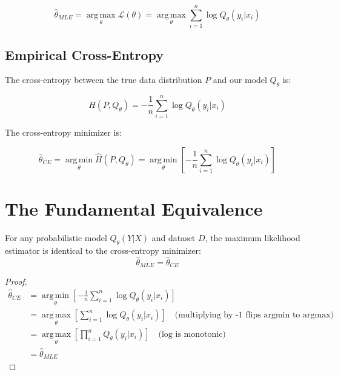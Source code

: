 \begin{notechapter}
\begin{definition}
\[
\hat{\theta}_{MLE} = 
\operatorname*{arg\,max}_{\theta} \mathcal{L}(\theta) = 
\operatorname*{arg\,max}_{\theta} \sum_{i=1}^n \log Q_\theta(y_i | x_i)
\]
\end{definition}

\subsection{Empirical Cross-Entropy}

The cross-entropy between the true data distribution $P$ and our model $Q_\theta$ is:

\begin{definition}
\[
\hat{H}(P, Q_\theta) = -\frac{1}{n} \sum_{i=1}^n \log Q_\theta(y_i | x_i)
\]
\end{definition}

The cross-entropy minimizer is:

\begin{definition}
\[
\hat{\theta}_{CE} = 
\operatorname*{arg\,min}_{\theta} \hat{H}(P, Q_\theta) = 
\operatorname*{arg\,min}_{\theta} \left[ -\frac{1}{n} \sum_{i=1}^n \log Q_\theta(y_i | x_i) \right]
\]
\end{definition}

\section{The Fundamental Equivalence}

\begin{theorem}
For any probabilistic model $Q_\theta(Y|X)$ and dataset $D$, the maximum likelihood estimator is identical to the cross-entropy minimizer:
\[
\hat{\theta}_{MLE} = \hat{\theta}_{CE}
\]
\end{theorem}

\begin{proof}
\begin{align*}
\hat{\theta}_{CE} &= \operatorname*{arg\,min}_{\theta} \left[ -\frac{1}{n} \sum_{i=1}^n \log Q_\theta(y_i | x_i) \right] \\
&= \operatorname*{arg\,max}_{\theta} \left[ \sum_{i=1}^n \log Q_\theta(y_i | x_i) \right] \quad \text{(multiplying by -1 flips argmin to argmax)} \\
&= \operatorname*{arg\,max}_{\theta} \left[ \prod_{i=1}^n Q_\theta(y_i | x_i) \right] \quad \text{(log is monotonic)} \\
&= \hat{\theta}_{MLE}
\end{align*}


\end{proof}
\end{notechapter}
